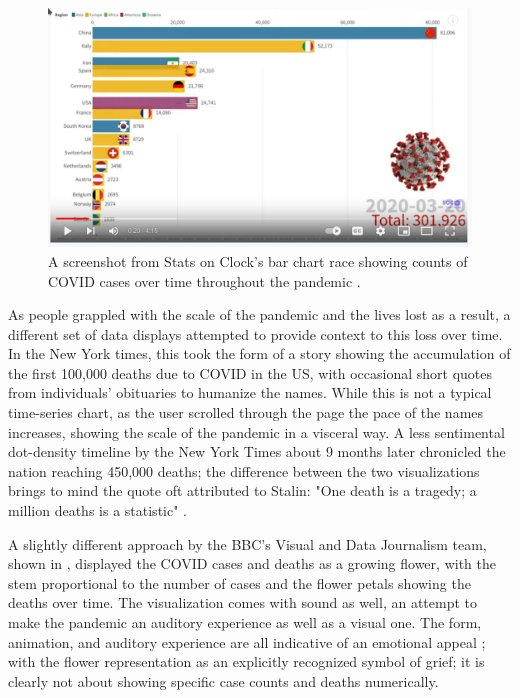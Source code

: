 \documentclass[article]{jdssv}\usepackage[]{graphicx}\usepackage[]{xcolor}
\begin{document}
\begin{figure}
\centering
\includegraphics[width=.8\linewidth]{Figures_Web/Bar-chart-race-screenshot}
\caption{A screenshot from Stats on Clock's bar chart race showing counts of COVID cases over time throughout the pandemic \citep{clockCoronavirusCasesBar2022}.}\label{fig:barchart-race}
\end{figure}

As people grappled with the scale of the pandemic and the lives lost as a result, a different set of data displays attempted to provide context to this loss over time. In the New York times, this took the form of a story showing the accumulation of the first 100,000 deaths due to COVID in the US, with occasional short quotes from individuals' obituaries to humanize the names\citep{barryRemembering1000002020}. While this is not a typical time-series chart, as the user scrolled through the page the pace of the names increases, showing the scale of the pandemic in a visceral way. A less sentimental dot-density timeline by the New York Times about 9 months later chronicled the nation reaching 450,000 deaths; the difference between the two visualizations brings to mind the quote oft attributed to Stalin: "One death is a tragedy; a million deaths is a statistic" \citep{investigatorSingleDeathTragedy2016}.

A slightly different approach by the BBC's Visual and Data Journalism team, shown in , displayed the COVID cases and deaths as a growing flower, with the stem proportional to the number of cases and the flower petals showing the deaths over time\citep{thebbcvisualanddatajournalismteamCoronavirusHowCan2020}. The visualization comes with sound as well, an attempt to make the pandemic an auditory experience as well as a visual one. The form, animation, and auditory experience are all indicative of an emotional appeal \citep{kostelnick_re-emergence_2016,dignazio_data_2020}; with the flower representation as an explicitly recognized symbol of grief; it is clearly not about showing specific case counts and deaths numerically.
\end{document}

